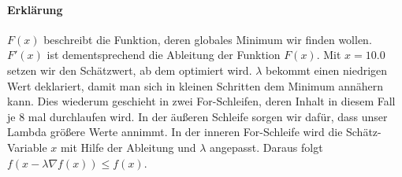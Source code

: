 \paragraph{Erklärung}

$F(x)$ beschreibt die Funktion, deren globales Minimum wir finden wollen. $F'(x)$ ist dementsprechend die Ableitung der Funktion $F(x)$. Mit $x=10.0$ setzen wir den Schätzwert, ab dem optimiert wird. $\lambda$ bekommt einen niedrigen Wert deklariert, damit man sich in kleinen Schritten dem Minimum annähern kann. Dies wiederum geschieht in zwei For-Schleifen, deren Inhalt in diesem Fall je 8 mal durchlaufen wird. In der äußeren Schleife sorgen wir dafür, dass unser Lambda größere Werte annimmt. In der inneren For-Schleife wird die Schätz-Variable $x$ mit Hilfe der Ableitung und $\lambda$ angepasst. Daraus folgt
 $f(x-\lambda \nabla f(x)) \leq f(x)$.

